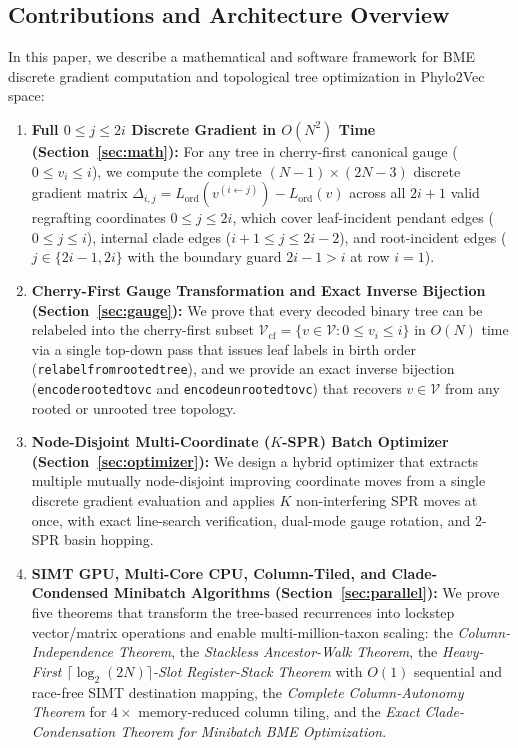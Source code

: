 \documentclass[11pt,a4paper]{article}
\makeatletter
\DeclareRobustCommand{\_}{\ifmmode\nfss@text{\textunderscore}\else\textunderscore\allowbreak\fi}
\theoremstyle{definition}
\makeatother
\begin{document}
\subsection{Contributions and Architecture Overview}
In this paper, we describe a mathematical and software framework for BME discrete gradient computation and topological tree optimization in Phylo2Vec space:
\begin{enumerate}
    \item \textbf{Full $0 \le j \le 2i$ Discrete Gradient in $O(N^2)$ Time (Section~\ref{sec:math}):} For any tree in cherry-first canonical gauge ($0 \le v_i \le i$), we compute the complete $(N-1) \times (2N-3)$ discrete gradient matrix $\Delta_{i,j} = L_{\text{ord}}(v^{(i \leftarrow j)}) - L_{\text{ord}}(v)$ across all $2i+1$ valid regrafting coordinates $0 \le j \le 2i$, which cover leaf-incident pendant edges ($0 \le j \le i$), internal clade edges ($i+1 \le j \le 2i-2$), and root-incident edges ($j \in \{2i-1, 2i\}$ with the boundary guard $2i-1 > i$ at row $i=1$).
    \item \textbf{Cherry-First Gauge Transformation and Exact Inverse Bijection (Section~\ref{sec:gauge}):} We prove that every decoded binary tree can be relabeled into the cherry-first subset $\mathcal{V}_{\text{cf}} = \{v \in \mathcal{V} : 0 \le v_i \le i\}$ in $O(N)$ time via a single top-down pass that issues leaf labels in birth order (\texttt{relabel\_from\_rooted\_tree}), and we provide an exact inverse bijection (\texttt{encode\_rooted\_to\_v\_c} and \texttt{encode\_unrooted\_to\_v\_c}) that recovers $v \in \mathcal{V}$ from any rooted or unrooted tree topology.
    \item \textbf{Node-Disjoint Multi-Coordinate ($K$-SPR) Batch Optimizer (Section~\ref{sec:optimizer}):} We design a hybrid optimizer that extracts multiple mutually node-disjoint improving coordinate moves from a single discrete gradient evaluation and applies $K$ non-interfering SPR moves at once, with exact line-search verification, dual-mode gauge rotation, and 2-SPR basin hopping.
    \item \textbf{SIMT GPU, Multi-Core CPU, Column-Tiled, and Clade-Condensed Minibatch Algorithms (Section~\ref{sec:parallel}):} We prove five theorems that transform the tree-based recurrences into lockstep vector/matrix operations and enable multi-million-taxon scaling: the \emph{Column-Independence Theorem}, the \emph{Stackless Ancestor-Walk Theorem}, the \emph{Heavy-First $\lceil \log_2(2N) \rceil$-Slot Register-Stack Theorem} with $O(1)$ sequential and race-free SIMT destination mapping, the \emph{Complete Column-Autonomy Theorem} for $4\times$ memory-reduced column tiling, and the \emph{Exact Clade-Condensation Theorem for Minibatch BME Optimization}.
\end{enumerate}
\end{document}
